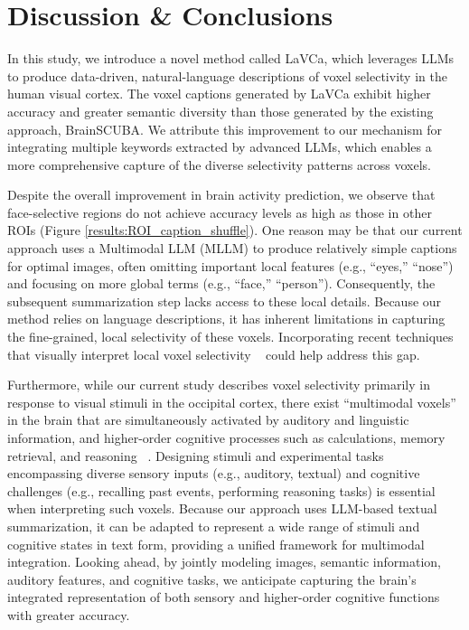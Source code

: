 \section{Discussion \& Conclusions}
In this study, we introduce a novel method called LaVCa, which leverages LLMs to produce data-driven, natural-language descriptions of voxel selectivity in the human visual cortex. The voxel captions generated by LaVCa exhibit higher accuracy and greater semantic diversity than those generated by the existing approach, BrainSCUBA. We attribute this improvement to our mechanism for integrating multiple keywords extracted by advanced LLMs, which enables a more comprehensive capture of the diverse selectivity patterns across voxels.

Despite the overall improvement in brain activity prediction, we observe that face-selective regions do not achieve accuracy levels as high as those in other ROIs (Figure \ref{results:ROI_caption_shuffle}). One reason may be that our current approach uses a Multimodal LLM (MLLM) to produce relatively simple captions for optimal images, often omitting important local features (e.g., ``eyes,'' ``nose'') and focusing on more global terms (e.g., ``face,'' ``person''). Consequently, the subsequent summarization step lacks access to these local details. Because our method relies on language descriptions, it has inherent limitations in capturing the fine-grained, local selectivity of these voxels. Incorporating recent techniques that visually interpret local voxel selectivity ~\cite{luo2024brain} could help address this gap.

Furthermore, while our current study describes voxel selectivity primarily in response to visual stimuli in the occipital cortex, there exist ``multimodal voxels'' in the brain that are simultaneously activated by auditory and linguistic information, and higher-order cognitive processes such as calculations, memory retrieval, and reasoning ~\cite{nakai2020quantitative, nakai2022representations}. Designing stimuli and experimental tasks encompassing diverse sensory inputs (e.g., auditory, textual) and cognitive challenges (e.g., recalling past events, performing reasoning tasks) is essential when interpreting such voxels. Because our approach uses LLM-based textual summarization, it can be adapted to represent a wide range of stimuli and cognitive states in text form, providing a unified framework for multimodal integration. Looking ahead, by jointly modeling images, semantic information, auditory features, and cognitive tasks, we anticipate capturing the brain’s integrated representation of both sensory and higher-order cognitive functions with greater accuracy.

